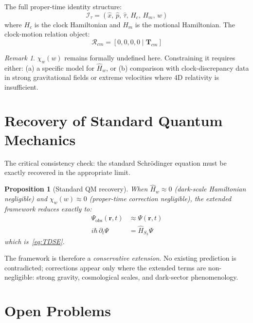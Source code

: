 \documentclass[11pt, a4paper, oneside]{article}
\theoremstyle{definition}
\theoremstyle{plain}
\newtheorem{proposition}{Proposition}[section]
\theoremstyle{remark}
\newtheorem{remark}{Remark}[section]
\begin{document}
The full proper-time identity structure:
\begin{equation}
  \mathcal{I}_\tau
  = \left(\hat{x},\, \hat{p},\, \hat{\tau},\, H_c,\, H_m,\, w\right)
  \label{eq:proper-time-identity}
\end{equation}
where $H_c$ is the clock Hamiltonian and $H_m$ is the motional Hamiltonian.
The clock-motion relation object:
\begin{equation}
  \mathcal{R}_{cm} = [0, 0, 0, 0 \mid \mathbf{T}_{cm}]
\end{equation}

\begin{remark}
  $\chi_w(w)$ remains formally undefined here. Constraining it requires
  either: (a) a specific model for $\hat{H}_w$, or (b) comparison with
  clock-discrepancy data in strong gravitational fields or extreme
  velocities where 4D relativity is insufficient.
\end{remark}

\section{Recovery of Standard Quantum Mechanics}

The critical consistency check: the standard Schr\"{o}dinger equation must
be exactly recovered in the appropriate limit.

\begin{proposition}[Standard QM recovery]
  When $\hat{H}_w \approx 0$ (dark-scale Hamiltonian negligible) and
  $\chi_w(w) \approx 0$ (proper-time correction negligible), the
  extended framework reduces exactly to:
  \begin{align}
	\Psi_\text{obs}(\mathbf{r},t) &\approx \Psi(\mathbf{r},t) \\
	i\hbar\,\partial_t\Psi &= \hat{H}_{S_3}\Psi
  \end{align}
  which is~\eqref{eq:TDSE}.
\end{proposition}

The framework is therefore a \emph{conservative extension}. No existing
prediction is contradicted; corrections appear only where the extended
terms are non-negligible: strong gravity, cosmological scales, and
dark-sector phenomenology.

\section{Open Problems}
\end{document}
